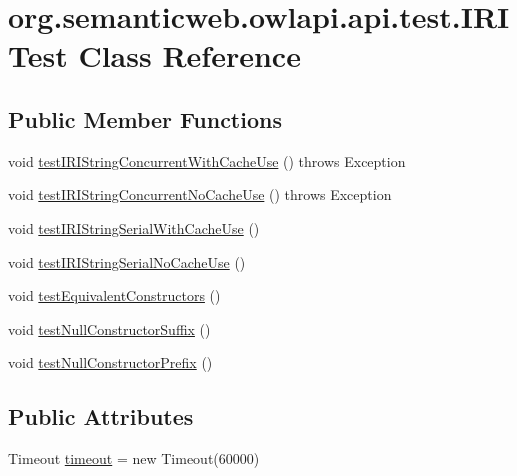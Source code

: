 \hypertarget{classorg_1_1semanticweb_1_1owlapi_1_1api_1_1test_1_1_i_r_i_test}{\section{org.\-semanticweb.\-owlapi.\-api.\-test.\-I\-R\-I\-Test Class Reference}
\label{classorg_1_1semanticweb_1_1owlapi_1_1api_1_1test_1_1_i_r_i_test}
}
\subsection*{Public Member Functions}
\begin{DoxyCompactItemize}
\item 
void \hyperlink{classorg_1_1semanticweb_1_1owlapi_1_1api_1_1test_1_1_i_r_i_test_ac6e2be23685f783b63345749b56f8704}{test\-I\-R\-I\-String\-Concurrent\-With\-Cache\-Use} ()  throws Exception 
\item 
void \hyperlink{classorg_1_1semanticweb_1_1owlapi_1_1api_1_1test_1_1_i_r_i_test_af8ac721ad6cdf0a9c0c4930211b5997c}{test\-I\-R\-I\-String\-Concurrent\-No\-Cache\-Use} ()  throws Exception 
\item 
void \hyperlink{classorg_1_1semanticweb_1_1owlapi_1_1api_1_1test_1_1_i_r_i_test_aff6a9061ce560485c6e3ef9cd8815b01}{test\-I\-R\-I\-String\-Serial\-With\-Cache\-Use} ()
\item 
void \hyperlink{classorg_1_1semanticweb_1_1owlapi_1_1api_1_1test_1_1_i_r_i_test_a51c1610c310bba9230abe8b95e3d5114}{test\-I\-R\-I\-String\-Serial\-No\-Cache\-Use} ()
\item 
void \hyperlink{classorg_1_1semanticweb_1_1owlapi_1_1api_1_1test_1_1_i_r_i_test_a305ee22493a88c234f22c006d56d0932}{test\-Equivalent\-Constructors} ()
\item 
void \hyperlink{classorg_1_1semanticweb_1_1owlapi_1_1api_1_1test_1_1_i_r_i_test_a6d54a54bf7f2f5015261e7da26994c60}{test\-Null\-Constructor\-Suffix} ()
\item 
void \hyperlink{classorg_1_1semanticweb_1_1owlapi_1_1api_1_1test_1_1_i_r_i_test_ad7f459ab7f4b4aabcce273c8ae13f76c}{test\-Null\-Constructor\-Prefix} ()
\end{DoxyCompactItemize}
\subsection*{Public Attributes}
\begin{DoxyCompactItemize}
\item 
Timeout \hyperlink{classorg_1_1semanticweb_1_1owlapi_1_1api_1_1test_1_1_i_r_i_test_aa86260cf784404e777b655aaee31c70f}{timeout} = new Timeout(60000)
\end{DoxyCompactItemize}



